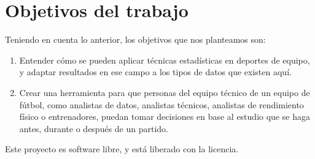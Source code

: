 \section{Objetivos del trabajo} \label{sect:goals}
Teniendo en cuenta lo anterior, los objetivos que nos planteamos son:

\begin{enumerate}
    \item Entender cómo se pueden aplicar técnicas estadísticas en deportes de equipo, 
    y adaptar resultados en ese campo a los tipos de datos que existen aquí.
    \item Crear una herramienta para que personas del equipo 
    técnico de un equipo de fútbol, como analistas de datos, analistas técnicos, analistas de rendimiento 
    físico o entrenadores, puedan tomar decisiones en base al estudio que se haga antes, durante 
    o después de un partido. 
\end{enumerate}

Este proyecto es software libre, y está liberado con la licencia\cite{gplv3}.
